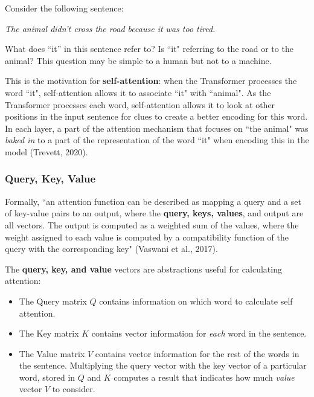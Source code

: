 Consider the following sentence: 


\begin{shadequote}{}
\vspace{10pt}
\Large \textit{The animal didn't cross the road because it was too tired.}
\vspace{10pt}
\end{shadequote}

What does ``it” in this sentence refer to? Is ``it" referring to the road or to the animal? This question may be simple to a human but not to a machine. 

This is the motivation for \textbf{self-attention}: when the Transformer processes the word ``it", self-attention allows it to associate ``it" with ``animal". As the Transformer processes each word, self-attention allows it to look at other positions in the input sentence for clues to create a better encoding for this word. In each layer, a part of the attention mechanism that focuses on ``the animal" was \emph{baked in} to a part of the representation of the word ``it" when encoding this in the model (Trevett, 2020). 


\subsubsection{Query, Key, Value}

Formally, ``an attention function can be described as mapping a query and a set of key-value pairs to an output, where the \textbf{query, keys, values}, and output are all vectors. The output is computed as a weighted sum of the values, where the weight assigned to each value is computed by a compatibility function of the query with the corresponding key" (Vaswani et al., 2017). 


The \textbf{query, key, and value} vectors are abstractions useful for calculating attention:
\begin{itemize}
    \item The Query matrix $Q$ contains information on which word to calculate self attention. 
    
     \item The Key matrix $K$ contains vector information for \emph{each} word in the sentence.
     
    \item The Value matrix $V$ contains vector information for the rest of the words in the sentence. Multiplying the query vector with the key vector of a particular word, stored in $Q$ and $K$ computes a result that indicates how much \emph{value} vector $V$ to consider.
\end{itemize}

